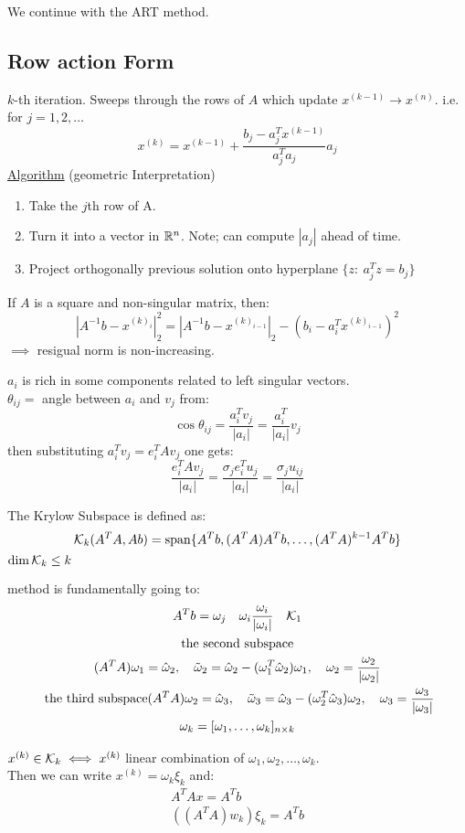 We continue with the ART method. 
\subsection{Row action Form}
$k$-th iteration. Sweeps through the rows of $A$ which update $x^{(k-1)} \to x^{(n)}$. i.e. for $j=1,2,\ldots$
$$x^{(k)} = x^{(k-1)} + \frac{b_j - a^T_j x^{(k-1)}}{a^T_j a_j} a_j$$
\underline{Algorithm} (geometric Interpretation)
\begin{enumerate}[1)]
\item Take the $j$th row of A.
\item Turn it into a vector in $\mathbb{R}^n$. Note; can compute $|a_j|$ ahead of time.
\item Project orthogonally previous solution onto hyperplane $\{z: \  a^T_j z = b_j\}$
\end{enumerate}

\begin{teorema}
If $A$ is a square and non-singular matrix, then:
$$\left| A^{-1}b - x^{(k)_i} \right|_2^2 = \left| A^{-1}b - x^{(k)_{i-1}} \right|_2 - (b_i - a^T_i x^{(k)_{i-1}})^2$$
$\implies$ resigual norm is non-increasing.
\end{teorema}

\begin{teorema}
$a_i$ is rich in some components related to left singular vectors. \\
$\theta_{ij}=$ angle between $a_i$ and $v_j$ from:
$$\cos \theta_{ij} = \frac{a_i^T v_j}{|a_i|} = \frac{a^T_i}{|a_i|} v_j$$
then substituting $a_i^T v_j = e^T_i A v_j$  one gets:
$$\frac{e^T_i A v_j}{|a_i|} = \frac{\sigma_j e^T_i u_j}{|a_i|} = \frac{\sigma_j u_{ij}}{|a_i|}$$
\end{teorema}

\begin{ddef}
The Krylow Subspace is defined as:
$$\mathbf{\mathcal{K}}_k(A^TA,Ab) = \operatorname{span}\{A^Tb  , (A^TA)A^Tb, \ldots, (A^TA)^{k-1} A^Tb\}$$
$\dim \mathbf{\mathcal{K}}_k \leq k$
\end{ddef}
method is fundamentally going to:
\begin{gather*}
A^Tb = \omega_j \quad \omega_i \frac{\omega_i}{|\omega_i|} \quad \mathbf{\mathcal{K}}_1\\
\text{the second subspace}\\
(A^TA)\omega_1 = \hat \omega_2, \quad \tilde \omega_2 = \hat \omega_2 - (\omega_1^T\hat \omega_2) \omega_1, \quad \omega_2  =\frac{\omega_2}{|\omega_2|} \\
\text{ the third subspace}
(A^TA)\omega_2 = \hat \omega_3, \quad \tilde \omega_3 = \hat \omega_3 - (\omega_2^T\hat \omega_3) \omega_2, \quad \omega_3  =\frac{\omega_3}{|\omega_3|} \\
\omega_k = [\omega_1,\ldots, \omega_k ] _{n\times k}
\end{gather*}

$x^{(k)} \in \mathbf{\mathcal{K}}_k \iff x^{(k) } $ linear combination of $\omega_1, \omega_2 , \ldots, \omega_k$.\\
Then we can write $x^{(k)} = \omega_k \xi _k$ and:
\begin{gather*}
A^TAx= A^Tb\\
((A^TA)w_k)\xi_k = A^Tb
\end{gather*}
